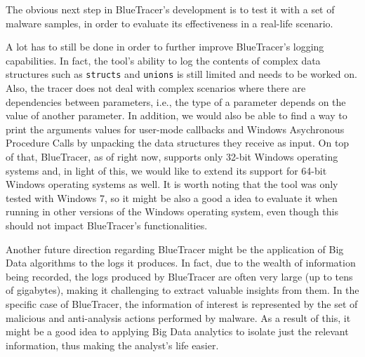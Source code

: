 The obvious next step in BlueTracer's development is to test it with a set of malware samples, in order to evaluate its effectiveness in a real-life scenario.

A lot has to still be done in order to further improve BlueTracer's logging capabilities. In fact, the tool's ability to log the contents of complex data structures such as \texttt{structs} and \texttt{unions} is still limited and needs to be worked on. Also, the tracer does not deal with complex scenarios where there are dependencies between parameters, i.e., the type of a parameter depends on the value of another parameter. In addition, we would also be able to find a way to print the arguments values for user-mode callbacks and Windows Asychronous Procedure Calls by unpacking the data structures they receive as input. On top of that, BlueTracer, as of right now, supports only 32-bit Windows operating systems and, in light of this, we would like to extend its support for 64-bit Windows operating systems as well. It is worth noting that the tool was only tested with Windows 7, so it might be also a good a idea to evaluate it when running in other versions of the Windows operating system, even though this should not impact BlueTracer's functionalities.

Another future direction regarding BlueTracer might be the application of Big Data algorithms to the logs it produces. In fact, due to the wealth of information being recorded, the logs produced by BlueTracer are often very large (up to tens of gigabytes), making it challenging to extract valuable insights from them. In the specific case of BlueTracer, the information of interest is represented by the set of malicious and anti-analysis actions performed by malware. As a result of this, it might be a good idea to applying Big Data analytics to isolate just the relevant information, thus making the analyst's life easier.

\iffalse
Two areas:
\begin{enumerate}
\item Tools capabilities: support for struct, compatibility extension, more malwares tested
\item Data Analysis Techniques: data analysis for threat intelligence to analyze the logs.
\end{enumerate}
\fi